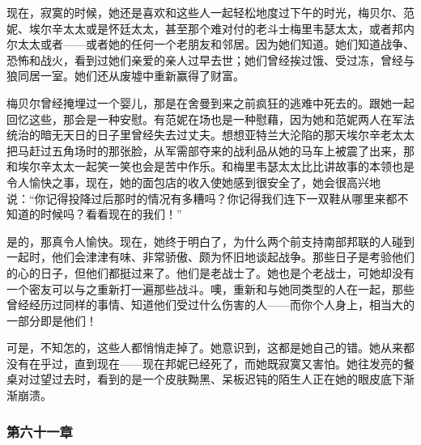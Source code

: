 \par 现在，寂寞的时候，她还是喜欢和这些人一起轻松地度过下午的时光，梅贝尔、范妮、埃尔辛太太或是怀廷太太，甚至那个难对付的老斗士梅里韦瑟太太，或者邦内尔太太或者——或者她的任何一个老朋友和邻居。因为她们知道。她们知道战争、恐怖和战火，看到过她们亲爱的亲人过早去世；她们曾经挨过饿、受过冻，曾经与狼同居一室。她们还从废墟中重新赢得了财富。
\par 梅贝尔曾经掩埋过一个婴儿，那是在舍曼到来之前疯狂的逃难中死去的。跟她一起回忆这些，那会是一种安慰。有范妮在场也是一种慰藉，因为她和范妮两人在军法统治的暗无天日的日子里曾经失去过丈夫。想想亚特兰大沦陷的那天埃尔辛老太太把马赶过五角场时的那张脸，从军需部夺来的战利品从她的马车上被震了出来，那和埃尔辛太太一起笑一笑也会是苦中作乐。和梅里韦瑟太太比比讲故事的本领也是令人愉快之事，现在，她的面包店的收入使她感到很安全了，她会很高兴地说：“你记得投降过后那时的情况有多糟吗？你记得我们连下一双鞋从哪里来都不知道的时候吗？看看现在的我们！”
\par 是的，那真令人愉快。现在，她终于明白了，为什么两个前支持南部邦联的人碰到一起时，他们会津津有味、非常骄傲、颇为怀旧地谈起战争。那些日子是考验他们的心的日子，但他们都挺过来了。他们是老战士了。她也是个老战士，可她却没有一个密友可以与之重新打一遍那些战斗。噢，重新和与她同类型的人在一起，那些曾经经历过同样的事情、知道他们受过什么伤害的人——而你个人身上，相当大的一部分即是他们！
\par 可是，不知怎的，这些人都悄悄走掉了。她意识到，这都是她自己的错。她从来都没有在乎过，直到现在——现在邦妮已经死了，而她既寂寞又害怕。她往发亮的餐桌对过望过去时，看到的是一个皮肤黝黑、呆板迟钝的陌生人正在她的眼皮底下渐渐崩溃。

\subsubsection{第六十一章}

